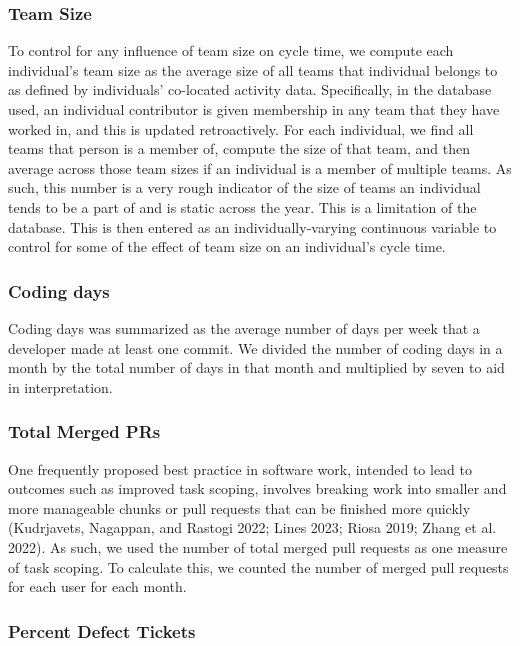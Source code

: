 \documentclass[
]{article}
\begin{document}
\subsubsection{Team Size}\label{team-size}

To control for any influence of team size on cycle time, we compute each
individual's team size as the average size of all teams that individual
belongs to as defined by individuals' co-located activity data.
Specifically, in the database used, an individual contributor is given
membership in any team that they have worked in, and this is updated
retroactively. For each individual, we find all teams that person is a
member of, compute the size of that team, and then average across those
team sizes if an individual is a member of multiple teams. As such, this
number is a very rough indicator of the size of teams an individual
tends to be a part of and is static across the year. This is a
limitation of the database. This is then entered as an
individually-varying continuous variable to control for some of the
effect of team size on an individual's cycle time.

\subsubsection{Coding days}\label{coding-days}

Coding days was summarized as the average number of days per week that a
developer made at least one commit. We divided the number of coding days
in a month by the total number of days in that month and multiplied by
seven to aid in interpretation.

\subsubsection{Total Merged PRs}\label{total-merged-prs}

One frequently proposed best practice in software work, intended to lead
to outcomes such as improved task scoping, involves breaking work into
smaller and more manageable chunks or pull requests that can be finished
more quickly (Kudrjavets, Nagappan, and Rastogi 2022; Lines 2023; Riosa
2019; Zhang et al. 2022). As such, we used the number of total merged
pull requests as one measure of task scoping. To calculate this, we
counted the number of merged pull requests for each user for each month.

\subsubsection{Percent Defect Tickets}\label{percent-defect-tickets}
\end{document}
